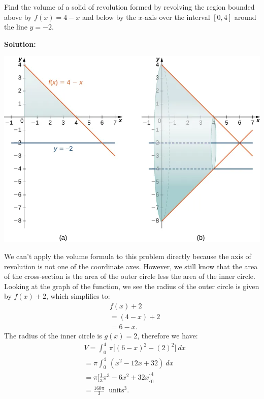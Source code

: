 \documentclass{report}
\begin{document}
    \bigbreak \noindent \bigbreak \noindent 
    \begin{eg}
        Find the volume of a solid of revolution formed by revolving the region bounded above by \( f(x) = 4 - x \) and below by the \( x \)-axis over the interval \([0, 4]\) around the line \( y = -2 \).
    \end{eg}
    \bigbreak \noindent 
    \textbf{Solution:} 
    \bigbreak \noindent 
    \begin{minipage}[]{0.47\textwidth}
        \begin{center}
            \includegraphics[scale=0.3]{./figures/graph25.png}
        \end{center} 
    \end{minipage}
    \begin{minipage}[]{0.47\textwidth}
        We can’t apply the volume formula to this problem directly because the axis of revolution is not one of the coordinate axes. However, we still know that the area of the cross-section is the area of the outer circle less the area of the inner circle. Looking at the graph of the function, we see the radius of the outer circle is given by  $f(x) +2$,
  which simplifies to:
  \begin{align*}
      &f(x) + 2  \\
      &= (4-x) + 2 \\
      &= 6-x
  .\end{align*}
  The radius of the inner circle is $g(x)=2$, therefore we have:
  \begin{align*}
      &V = \int_{0}^{4}\ \pi \bigg[(6-x)^{2}-(2)^{2}\bigg]\ dx \\
      &=\pi \int_{0}^{4}\ (x^{2}-12x+32)\ dx \\
      &=\pi\bigg[\frac{1}{3}\pi^{3}-6x^{2}+32x\bigg]^{4}_{0} \\
      &=\frac{160\pi}{3}\ \text{ units}^{3}
  .\end{align*}
    \end{minipage}
\end{document}
